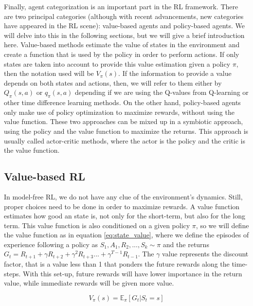 Finally, agent categorization is an important part in the RL framework. There are two principal categories (although with recent advancements, new categories have appeared in the RL scene): value-based agents and policy-based agents. We will delve into this in the following sections, but we will give a brief introduction here. Value-based methods estimate the value of states in the environment and create a function that is used by the policy in order to perform actions. If only states are taken into account to provide this value estimation given a policy $\pi$, then the notation used will be $V_{\pi}(s)$. If the information to provide a value depends on both states and actions, then, we will refer to them either by ${Q}_{\pi}(s,a)$ or ${q}_{\pi}(s,a)$ depending if we are using the Q-values from Q-learning or other time difference learning methods. On the other hand, policy-based agents only make use of policy optimization to maximize rewards, without using the value function. These two approaches can be mixed up in a symbiotic approach, using the policy and the value function to maximize the returns. This approach is usually called actor-critic methods, where the actor is the policy and the critic is the value function.

\subsection{Value-based RL}
\label{sec:val-based-rl}
In model-free RL, we do not have any clue of the environment's dynamics. Still, proper choices need to be done in order to maximize rewards. A value function estimates how good an state is, not only for the short-term, but also for the long term. This value function is also conditioned on a given policy $\pi$, so we will define the value function as in equation \ref{eq:state_value}, where we define the episodes of experience following a policy as $S_1, A_1, R_2, ..., S_k \sim \pi$ and the returns $G_t = R_{t+1} + \gamma R_{t+2} + \gamma^2 R_{t+3} ... + \gamma^{T-1}R_{t-1}$. The $\gamma$ value represents the discount factor, that is a value less than 1 that ponders the future rewards along the time-steps. With this set-up, future rewards will have lower importance in the return value, while immediate rewards will be given more value.

\begin{equation} \label{eq:state_value}
	V_{\pi}(s) = \mathbb{E}_{\pi}[G_t | S_t = s]
\end{equation}

